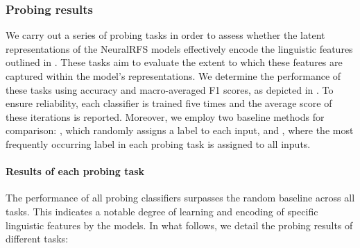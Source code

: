 \subsubsection{Probing results}

We carry out a series of probing tasks in order to assess whether the latent representations of the NeuralRFS models effectively encode the linguistic features outlined in . These tasks aim to evaluate the extent to which these features are captured within the model's representations. We determine the performance of these tasks using accuracy and macro-averaged F1 scores, as depicted in . To ensure reliability, each classifier is trained five times and the average score of these iterations is reported. Moreover, we employ two baseline methods for comparison: , which randomly assigns a label to each input, and
, where the most frequently occurring label in each probing task is assigned to all inputs.



\paragraph*{Results of each probing task} 

The performance of all probing classifiers surpasses the random baseline across all tasks. This indicates a notable degree of learning and encoding of specific linguistic features by the models. In what follows, we detail the probing results of different tasks:

